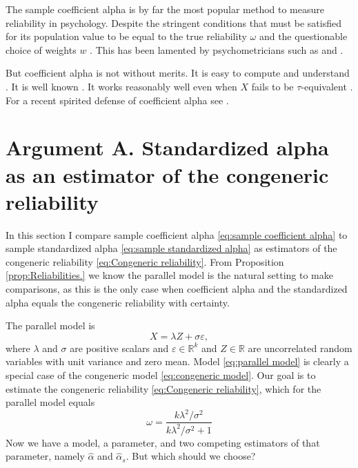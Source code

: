\documentclass[twoside]{article}
\begin{document}
The sample coefficient alpha is by far the most popular method to
measure reliability in psychology. Despite the stringent conditions
that must be satisfied for its population value to be equal to the
true reliability $\omega$ and the questionable choice of weights $w$ \citep{McNeish2019-ea}. This has been lamented by psychometricians such as \citet{McNeish2018-vu} and \citet{Sijtsma2009-hj}. 

But coefficient alpha is not without merits. It is easy to compute and understand \citep{Socan2000-aa}. It is well known \citep{Falk2011-ae}. It works reasonably well even when $X$ fails to be $\tau$-equivalent \citep{Raykov1997-bu}. For a recent spirited defense of coefficient alpha see \citep{Raykov2019-yr}.

\section{Argument A. Standardized alpha as an estimator of the congeneric reliability}
\label{sec:argument A}

In this section I compare sample coefficient alpha \eqref{eq:sample coefficient alpha} to sample standardized alpha \eqref{eq:sample standardized alpha} as estimators of the congeneric reliability \eqref{eq:Congeneric reliability}. From Proposition \ref{prop:Reliabilities.} we know the parallel model is the natural setting to make comparisons, as this is the only case when coefficient alpha and the standardized alpha equals the congeneric reliability with certainty.

The parallel model is
\begin{equation}
\label{eq:parallel model}
X = \lambda Z + \sigma\varepsilon,
\end{equation}
where $\lambda$ and $\sigma$ are positive scalars and $\varepsilon\in\mathbb{R}^k$ and $Z\in\mathbb{R}$ are uncorrelated random variables with unit variance and zero mean. Model \eqref{eq:parallel model} is clearly a special case of the congeneric model \eqref{eq:congeneric model}. Our goal is to estimate the congeneric reliability \eqref{eq:Congeneric reliability}, which for the parallel model equals
\begin{equation}
\label{eq:parallel_omega}
\omega = \frac{k\lambda^2/\sigma^2}{k\lambda^2/\sigma^2 + 1}
\end{equation}
Now we have a model, a parameter, and two competing estimators of that parameter, namely $\hat{\alpha}$ and $\hat{\alpha}_s$. But which should we choose? 
\end{document}
